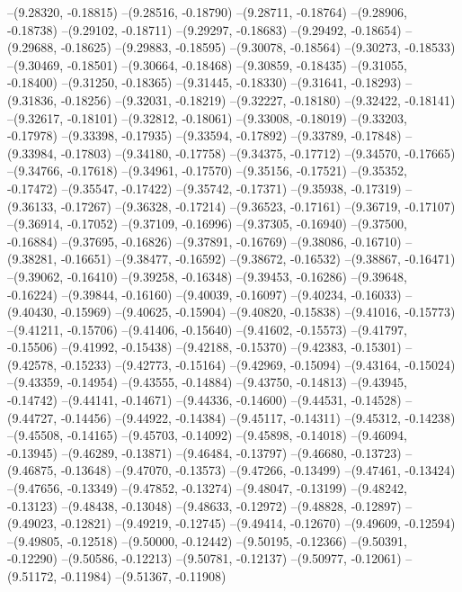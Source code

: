 --(9.28320, -0.18815)
--(9.28516, -0.18790)
--(9.28711, -0.18764)
--(9.28906, -0.18738)
--(9.29102, -0.18711)
--(9.29297, -0.18683)
--(9.29492, -0.18654)
--(9.29688, -0.18625)
--(9.29883, -0.18595)
--(9.30078, -0.18564)
--(9.30273, -0.18533)
--(9.30469, -0.18501)
--(9.30664, -0.18468)
--(9.30859, -0.18435)
--(9.31055, -0.18400)
--(9.31250, -0.18365)
--(9.31445, -0.18330)
--(9.31641, -0.18293)
--(9.31836, -0.18256)
--(9.32031, -0.18219)
--(9.32227, -0.18180)
--(9.32422, -0.18141)
--(9.32617, -0.18101)
--(9.32812, -0.18061)
--(9.33008, -0.18019)
--(9.33203, -0.17978)
--(9.33398, -0.17935)
--(9.33594, -0.17892)
--(9.33789, -0.17848)
--(9.33984, -0.17803)
--(9.34180, -0.17758)
--(9.34375, -0.17712)
--(9.34570, -0.17665)
--(9.34766, -0.17618)
--(9.34961, -0.17570)
--(9.35156, -0.17521)
--(9.35352, -0.17472)
--(9.35547, -0.17422)
--(9.35742, -0.17371)
--(9.35938, -0.17319)
--(9.36133, -0.17267)
--(9.36328, -0.17214)
--(9.36523, -0.17161)
--(9.36719, -0.17107)
--(9.36914, -0.17052)
--(9.37109, -0.16996)
--(9.37305, -0.16940)
--(9.37500, -0.16884)
--(9.37695, -0.16826)
--(9.37891, -0.16769)
--(9.38086, -0.16710)
--(9.38281, -0.16651)
--(9.38477, -0.16592)
--(9.38672, -0.16532)
--(9.38867, -0.16471)
--(9.39062, -0.16410)
--(9.39258, -0.16348)
--(9.39453, -0.16286)
--(9.39648, -0.16224)
--(9.39844, -0.16160)
--(9.40039, -0.16097)
--(9.40234, -0.16033)
--(9.40430, -0.15969)
--(9.40625, -0.15904)
--(9.40820, -0.15838)
--(9.41016, -0.15773)
--(9.41211, -0.15706)
--(9.41406, -0.15640)
--(9.41602, -0.15573)
--(9.41797, -0.15506)
--(9.41992, -0.15438)
--(9.42188, -0.15370)
--(9.42383, -0.15301)
--(9.42578, -0.15233)
--(9.42773, -0.15164)
--(9.42969, -0.15094)
--(9.43164, -0.15024)
--(9.43359, -0.14954)
--(9.43555, -0.14884)
--(9.43750, -0.14813)
--(9.43945, -0.14742)
--(9.44141, -0.14671)
--(9.44336, -0.14600)
--(9.44531, -0.14528)
--(9.44727, -0.14456)
--(9.44922, -0.14384)
--(9.45117, -0.14311)
--(9.45312, -0.14238)
--(9.45508, -0.14165)
--(9.45703, -0.14092)
--(9.45898, -0.14018)
--(9.46094, -0.13945)
--(9.46289, -0.13871)
--(9.46484, -0.13797)
--(9.46680, -0.13723)
--(9.46875, -0.13648)
--(9.47070, -0.13573)
--(9.47266, -0.13499)
--(9.47461, -0.13424)
--(9.47656, -0.13349)
--(9.47852, -0.13274)
--(9.48047, -0.13199)
--(9.48242, -0.13123)
--(9.48438, -0.13048)
--(9.48633, -0.12972)
--(9.48828, -0.12897)
--(9.49023, -0.12821)
--(9.49219, -0.12745)
--(9.49414, -0.12670)
--(9.49609, -0.12594)
--(9.49805, -0.12518)
--(9.50000, -0.12442)
--(9.50195, -0.12366)
--(9.50391, -0.12290)
--(9.50586, -0.12213)
--(9.50781, -0.12137)
--(9.50977, -0.12061)
--(9.51172, -0.11984)
--(9.51367, -0.11908)
